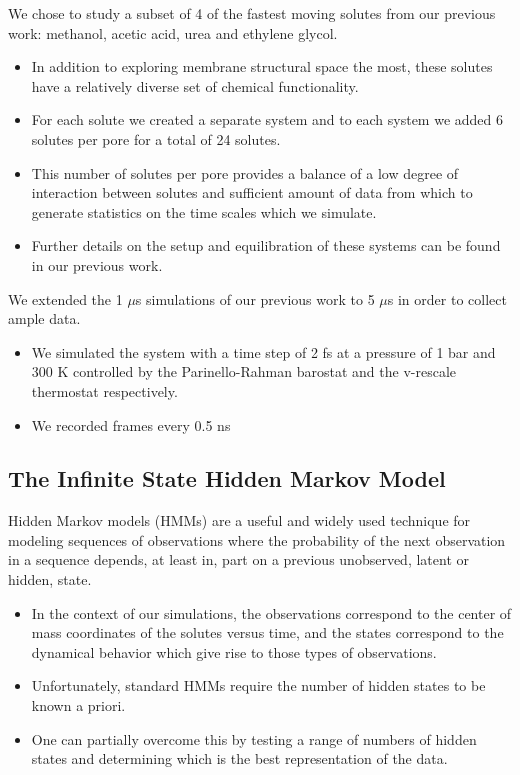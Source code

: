 \documentclass{article}
\begin{document}
  We chose to study a subset of 4 of the fastest moving solutes from our previous
  work: methanol, acetic acid, urea and ethylene glycol.
  \begin{itemize} 
    \item In addition to exploring membrane structural space the most, these solutes
    have a relatively diverse set of chemical functionality.   
    \item For each solute we created a separate system and to each system we
    added 6 solutes per pore for a total of 24 solutes.
    \item This number of solutes per pore provides a balance of a low 
    degree of interaction between solutes and sufficient amount of data from
    which to generate statistics on the time scales which we simulate.
    \item Further details on the setup and equilibration of these systems can
    be found in our previous work.\cite{coscia_chemically_2019}
  \end{itemize}
  
  \noindent We extended the 1 $\mu$s simulations of our previous work to 5 $\mu$s in order
  to collect ample data.
  \begin{itemize}
    \item We simulated the system with a time step of 2 fs at a pressure of 1 bar
    and 300 K controlled by the Parinello-Rahman barostat and the v-rescale thermostat
    respectively.
    \item We recorded frames every 0.5 ns
  \end{itemize}

  \subsection{The Infinite State Hidden Markov Model}\label{method:IHMM}
  
  Hidden Markov models (HMMs) are a useful and widely used technique
  for modeling sequences of observations where the probability of the next observation
  in a sequence depends, at least in, part on a previous unobserved, latent or hidden, state.~\cite{beal_infinite_2002}
  \begin{itemize}
    \item In the context of our simulations, the observations correspond to 
    the center of mass coordinates of the solutes versus time, and the states
    correspond to the dynamical behavior which give rise to those types
    of observations.
    \item Unfortunately, standard HMMs require the number of hidden states to be known
    a priori.
    \item One can partially overcome this by testing a range of numbers of 
    hidden states and determining which is the best representation of the
    data.
  \end{itemize}
  
\end{document}
